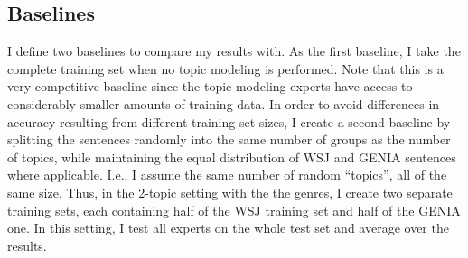 


\subsection{Baselines}

I define two baselines to compare my results with. As the first baseline, I take the complete training set when no topic modeling is performed. Note that this is a very competitive baseline since the topic modeling experts have access to considerably smaller amounts of training data.  In order to avoid differences in accuracy resulting from different training set sizes, I create a second baseline by splitting the sentences randomly into the same number of groups as the number of topics, while maintaining the equal distribution of WSJ and GENIA sentences where applicable. I.e., I assume the same number of random ``topics'', all of the same size. Thus, in the 2-topic setting with the the genres, I create two separate training sets, each containing half of the WSJ training set and half of the GENIA one. In this setting, I test all experts on the whole test set and average over the results.




